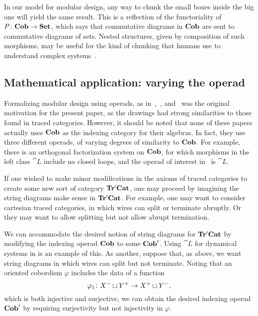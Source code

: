 \documentclass[12pt,oneside,article,draft]{memoir}
\begin{document}
In our model for modular design, any way to chunk the small boxes inside the big one will yield the
same result. This is a reflection of the functoriality of $P\colon\mathbf{Cob}\to\mathbf{Set}$, which says that
commutative diagrams in $\mathbf{Cob}$ are sent to commutative diagrams of sets. Nested structures, given
by composition of such morphisms, may be useful for the kind of chunking that humans use to
understand complex systems~\cite{Miller}.

\subsection{Mathematical application: varying the operad}\label{sec:math application}

Formalizing modular design using operads, as in~\cite{Spivak},~\cite{RupelSpivak}, and~\cite{VagnerSpivakLerman} was the original
motivation for the present paper, as the drawings had strong similarities to those found in traced
categories. However, it should be noted that none of these papers actually uses $\mathbf{Cob}$ as the
indexing category for their algebras. In fact, they use three different operads, of varying degrees
of similarity to $\mathbf{Cob}$. For example, there is an orthogonal factorization system on $\mathbf{Cob}$, for
which morphisms in the left class $\cat{L}$ include no closed loops, and the operad of interest in~\cite{VagnerSpivakLerman} is $\cat{L}$.

If one wished to make minor modifications in the axioms of traced categories to create some new sort of category $\mathbf{Tr'Cat}$, one may proceed by imagining the string diagrams make sense in $\mathbf{Tr'Cat}$. For example, one may want to consider cartesian traced categories, in which wires can split or terminate abruptly. Or they may want to allow splitting but not allow abrupt termination. 
\begin{center}
\end{center}
We can accommodate the desired notion of string diagrams for $\mathbf{Tr'Cat}$ by modifying the indexing operad $\mathbf{Cob}$ to some $\mathbf{Cob}'$. Using $\cat{L}$ for dynamical systems in \cite{VagnerSpivakLerman} is an example of this. As another, suppose that, as above, we want string diagrams in which wires can split but not terminate. Noting that an oriented cobordism $\varphi$ includes the data of a function
$$\varphi_1\colon X^-\sqcup Y^+\to X^+\sqcup Y^-,$$ 
which is both injective and surjective, we can obtain the desired indexing operad $\mathbf{Cob}'$ by requiring surjectivity but not injectivity in $\varphi$.
\end{document}

